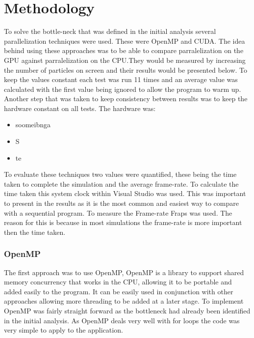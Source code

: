 \documentclass[12pt]{article}
\begin{document}
\section{Methodology}
To solve the bottle-neck that was defined in the initial analysis several parallelization techniques were used. These were OpenMP and CUDA. The idea behind using these approaches was to be able to compare parralelization on the GPU against  parralelization on the CPU.They would be measured by increasing the number of particles on screen and their results would be presented below.
\newline
To keep the values constant each test was run 11 times and an average value was calculated with the first value being ignored to allow the program to warm up. Another step that was taken to keep consistency between results was to keep the hardware constant on all tests. The hardware was:
\begin{itemize}
	\item soomeibnga
	\item S
	\item te
\end{itemize}
 To evaluate these techniques two values were quantified, these being the time taken to complete the simulation and the average frame-rate. To calculate the time taken this system clock within Visual Studio was used. This was important to present in the results as it is the most common and easiest way to compare with a sequential program. To measure the Frame-rate Fraps was used. The reason for this is because in most simulations the frame-rate is more important then the time taken. 

\subsubsection{OpenMP}
The first approach was to use OpenMP, OpenMP is a library to support shared memory concurrency that works in the CPU, allowing it to be portable and added easily to the program. It can  be easily used in conjunction with other approaches allowing more threading to be added at a later stage.
\newline 
To implement OpenMP was fairly straight forward as the bottleneck had already been identified in the initial analysis. As OpenMP deals very well with for loops the code was very simple to apply to the application.
\end{document}
